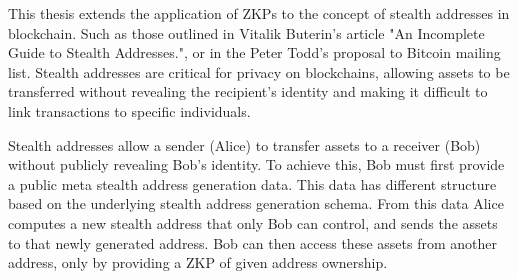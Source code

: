 This thesis extends the application of ZKPs to the concept of stealth
addresses in blockchain. Such as those outlined in Vitalik Buterin's article "An
Incomplete Guide to Stealth Addresses."\cite{ButerinIncompleteGuide}, or
in the Peter Todd's proposal to Bitcoin mailing list\cite{ToddStealthAddresses}.
Stealth addresses are critical for privacy on blockchains, allowing assets to
be transferred without revealing the recipient's identity and making
it difficult to link transactions to specific individuals.

Stealth addresses allow a sender (Alice) to transfer assets to a receiver (Bob) without
publicly revealing Bob's identity. To achieve this, Bob
must first provide a public meta stealth address generation data. This data
has different structure based on the underlying stealth address generation
schema. From this data Alice computes a new stealth address that only Bob can
control, and sends the assets to that newly generated address. Bob can then
access these assets from another address, only by providing a ZKP of given
address ownership.

